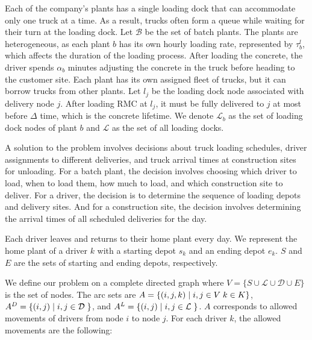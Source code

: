 \documentclass{article}
\begin{document}

Each of the company's plants has a single loading dock that can accommodate only one truck at a time. As a result, trucks often form a queue while waiting for their turn at the loading dock. Let $\mathcal{B}$ be the set of batch plants. The plants are heterogeneous, as each plant $b$ has its own hourly loading rate, represented by $\tau^l_b$, which affects the duration of the loading process. After loading the concrete, the driver spends $\alpha_b$ minutes adjusting the concrete in the truck before heading to the customer site. Each plant has its own assigned fleet of trucks, but it can borrow trucks from other plants. Let $l_{j}$ be the loading dock node associated with delivery node $j$. After loading RMC at $l_j$, it must be fully delivered to $j$ at most before $\Delta$ time, which is the concrete lifetime. We denote $\mathcal{L}_b$ as the set of loading dock nodes of plant $b$ and $\mathcal{L}$ as the set of all loading docks.

A solution to the problem involves decisions about truck loading schedules, driver assignments to different deliveries, and truck arrival times at construction sites for unloading. For a batch plant, the decision involves choosing which driver to load, when to load them, how much to load, and which construction site to deliver. For a driver, the decision is to determine the sequence of loading depots and delivery sites. And for a construction site, the decision involves determining the arrival times of all scheduled deliveries for the day.

Each driver leaves and returns to their home plant every day. We represent the home plant of a driver $k$ with a starting depot $s_k$ and an ending depot $e_k$. $S$ and $E$ are the sets of starting and ending depots, respectively.

We define our problem on a complete directed graph where $V=\{ S \cup \mathcal{L} \cup \mathcal{D} \cup E\}$ is the set of nodes. The arc sets are $A =  \{(i,j,k) \hspace*{1mm} \vert \hspace*{1mm} i, j \in V \hspace{1mm} k\in K \}$, $A^D = \{(i,j) \hspace*{1mm} \vert \hspace*{1mm} i, j \in \mathcal{D} \hspace{1mm} \}$, and $A^L = \{(i,j) \hspace*{1mm} \vert \hspace*{1mm} i, j \in \mathcal{L} \hspace{1mm} \}$.
$A$ corresponds to allowed movements of drivers from node $i$ to node $j$. For each driver $k$, the allowed movements are the following:
\end{document}
